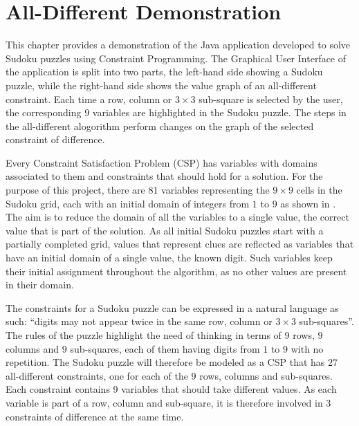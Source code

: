\documentclass{l4proj}
\begin{document}
\chapter{All-Different Demonstration}
\label{chap5alldiffdemo}

\noindent This chapter provides a demonstration of the Java application developed to solve Sudoku puzzles using Constraint Programming. The Graphical User Interface of the application is split into two parts, the left-hand side showing a Sudoku puzzle, while the right-hand side shows the value graph of an all-different constraint. Each time a row, column or $3 \times 3$ sub-square is selected by the user, the corresponding $9$ variables are highlighted in the Sudoku puzzle. The steps in the all-different alogorithm perform changes on the graph of the selected constraint of difference.

\noindent Every Constraint Satisfaction Problem (CSP) has variables with domains associated to them and constraints that should hold for a solution. For the purpose of this project, there are 81 variables representing the $9 \times 9$ cells in the Sudoku grid, each with an initial domain of integers from $1$ to $9$ as shown in . The aim is to reduce the domain of all the variables to a single value, the correct value that is part of the solution. As all initial Sudoku puzzles start with a partially completed grid, values that represent clues are reflected as variables that have an initial domain of a single value, the known digit. Such variables keep their initial assignment throughout the algorithm, as no other values are present in their domain.

\noindent The constraints for a Sudoku puzzle can be expressed in a natural language as such: “digits may not appear twice in the same row, column or $3\times 3$ sub-squares”. The rules of the puzzle highlight the need of thinking in terms of $9$ rows, $9$ columns and $9$ sub-squares, each of them having digits from $1$ to $9$ with no repetition. The Sudoku puzzle will therefore be modeled as a CSP \cite{simonis2005sudoku} that has $27$ all-different constraints, one for each of the $9$ rows, columns and sub-squares. Each constraint contains 9 variables that should take different values. As each variable is part of a row, column and sub-square, it is therefore involved in 3 constraints of difference at the same time.
\end{document}

